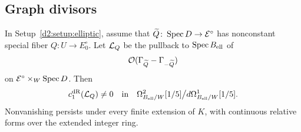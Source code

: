 \subsection{Graph divisors}

\begin{proposition}\label{d2:prop:graph}
In Setup~\ref{d2:setup:elliptic}, assume that
\(\widetilde Q\colon\operatorname{Spec} D\to\mathcal E^\circ\) has nonconstant special fiber
\(Q\colon U\to E_0^\circ\).
Let \(\mathcal L_Q\) be the pullback to \(\operatorname{Spec} B_{\mathrm{ell}}\) of
\[
 \mathcal O(\Gamma_{\widetilde Q}-\Gamma_{-\widetilde Q})
\]
on \(\mathcal E^\circ\times_W\operatorname{Spec} D\).
Then
\[
 c_1^{\mathrm{dR}}(\mathcal L_Q)\ne0
 \quad\text{in}\quad
 \Omega^2_{B_{\mathrm{ell}}/W}[1/5]\big/
       d\Omega^1_{B_{\mathrm{ell}}/W}[1/5].
\]
Nonvanishing persists under every finite extension of \(K\), with
continuous relative forms over the extended integer ring.
\end{proposition}

